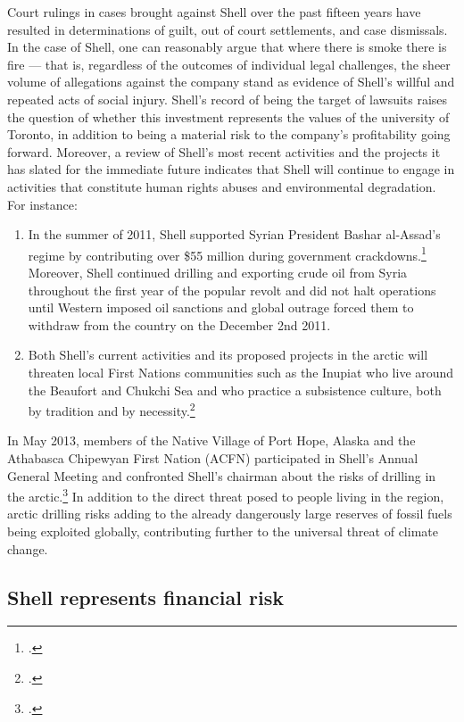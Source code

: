 	
Court rulings in cases brought against Shell over the past fifteen years have resulted in determinations of guilt, out of court settlements, and case dismissals. 
In the case of Shell, one can reasonably argue that where there is smoke there is fire --- that is, regardless of the outcomes of individual legal challenges, the sheer volume of allegations against the company stand as evidence of Shell's willful and repeated acts of social injury.
Shell's record of being the target of lawsuits raises the question of whether this investment represents the values of the university of Toronto, in addition to being a material risk to the company's profitability going forward.
Moreover, a review of Shell's most recent activities and the projects it has slated for the immediate future indicates that Shell will continue to engage in activities that constitute human rights abuses and environmental degradation.
For instance:
\begin{enumerate}
	\item In the summer of 2011, Shell supported Syrian President Bashar al-Assad's regime by contributing over \$55 million during government crackdowns.\footcite[][]{Syria_2011} Moreover, Shell continued drilling and exporting crude oil from Syria throughout the first year of the popular revolt and did not halt operations until Western imposed oil sanctions and global outrage forced them to withdraw from the country on the December 2nd 2011.
	\item Both Shell's current activities and its proposed projects in the arctic will threaten local First Nations communities such as the Inupiat who live around the Beaufort and Chukchi Sea and who practice a subsistence culture, both by tradition and by necessity.\footcite[][p. 13]{RiskingRuin_2012}
\end{enumerate}
In May 2013, members of the Native Village of Port Hope, Alaska and the Athabasca Chipewyan First Nation (ACFN) participated in Shell's Annual General Meeting and confronted Shell's chairman about the risks of drilling in the arctic.\footcite{ShellArcticOilRush}
In addition to the direct threat posed to people living in the region, arctic drilling risks adding to the already dangerously large reserves of fossil fuels being exploited globally, contributing further to the universal threat of climate change.


	\subsection{Shell represents financial risk}
	


